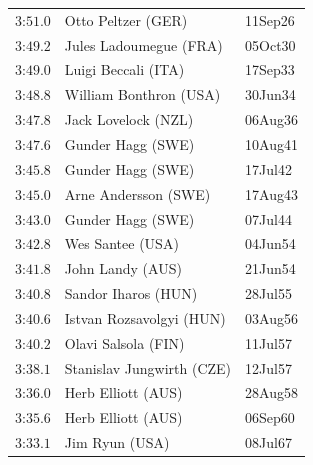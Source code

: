 \begin{figure}
{{\begin{tabular}[t]{|l|ll|}
         $\text{3:51}.0$   &Otto Peltzer (GER)     &11Sep26  \\
         $\text{3:49}.2$   &Jules Ladoumegue (FRA) &05Oct30  \\
         $\text{3:49}.0$   &Luigi Beccali (ITA)    &17Sep33  \\
         $\text{3:48}.8$   &William Bonthron (USA) &30Jun34  \\
         $\text{3:47}.8$   &Jack Lovelock (NZL)    &06Aug36  \\
         $\text{3:47}.6$   &Gunder Hagg (SWE)      &10Aug41  \\
         $\text{3:45}.8$   &Gunder Hagg (SWE)      &17Jul42  \\
         $\text{3:45}.0$   &Arne Andersson (SWE)   &17Aug43  \\
         $\text{3:43}.0$   &Gunder Hagg (SWE)      &07Jul44  \\
         $\text{3:42}.8$   &Wes Santee (USA)       &04Jun54  \\
         $\text{3:41}.8$   &John Landy (AUS)       &21Jun54  \\
         $\text{3:40}.8$   &Sandor Iharos (HUN)    &28Jul55  \\
         $\text{3:40}.6$   &Istvan Rozsavolgyi (HUN) &03Aug56 \\
         $\text{3:40}.2$   &Olavi Salsola (FIN)    &11Jul57  \\
         $\text{3:38}.1$   &Stanislav Jungwirth (CZE) &12Jul57  \\
         $\text{3:36}.0$   &Herb Elliott (AUS)     &28Aug58  \\
         $\text{3:35}.6$   &Herb Elliott (AUS)     &06Sep60  \\
         $\text{3:33}.1$   &Jim Ryun (USA)         &08Jul67  \\

\end{tabular}}}
\end{figure}
